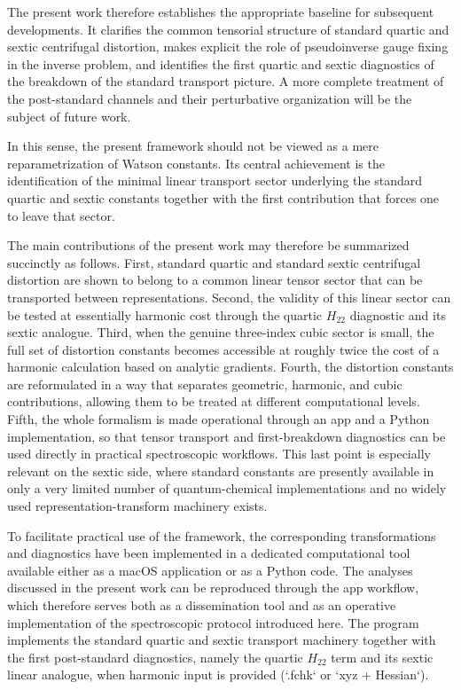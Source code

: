 \documentclass[journal=jacsat,manuscript=article]{achemso}
\begin{document}
The present work therefore establishes the appropriate baseline for
subsequent developments. It clarifies the common tensorial structure of
standard quartic and sextic centrifugal distortion, makes explicit the
role of pseudoinverse gauge fixing in the inverse problem, and
identifies the first quartic and sextic diagnostics of the breakdown of
the standard transport picture. A more complete treatment of the
post-standard channels and their perturbative organization will be the
subject of future work.

In this sense, the present framework should not be viewed as a mere
reparametrization of Watson constants. Its central achievement is the
identification of the minimal linear transport sector underlying the
standard quartic and sextic constants together with the first
contribution that forces one to leave that sector.

The main contributions of the present work may therefore be summarized
succinctly as follows. First, standard quartic and standard sextic
centrifugal distortion are shown to belong to a common linear tensor
sector that can be transported between representations. Second, the
validity of this linear sector can be tested at essentially harmonic
cost through the quartic $H_{22}$ diagnostic and its sextic analogue.
Third, when the genuine three-index cubic sector is small, the full set
of distortion constants becomes accessible at roughly twice the cost of
a harmonic calculation based on analytic gradients. Fourth, the
distortion constants are reformulated in a way that separates geometric,
harmonic, and cubic contributions, allowing them to be treated at
different computational levels. Fifth, the whole formalism is made
operational through an app and a Python implementation, so that tensor
transport and first-breakdown diagnostics can be used directly in
practical spectroscopic workflows. This last point is especially
relevant on the sextic side, where standard constants are presently
available in only a very limited number of quantum-chemical
implementations and no widely used representation-transform machinery
exists.

To facilitate practical use of the framework, the corresponding
transformations and diagnostics have been implemented in a dedicated
computational tool available either as a macOS application or as a
Python code. The analyses discussed in the present work can be
reproduced through the app workflow, which therefore serves both as a
dissemination tool and as an operative implementation of the
spectroscopic protocol introduced here. The program implements the
standard quartic and sextic transport machinery together with the first
post-standard diagnostics, namely the quartic $H_{22}$ term and its
sextic linear analogue, when harmonic input is provided (`.fchk` or
`xyz + Hessian`).
\end{document}
